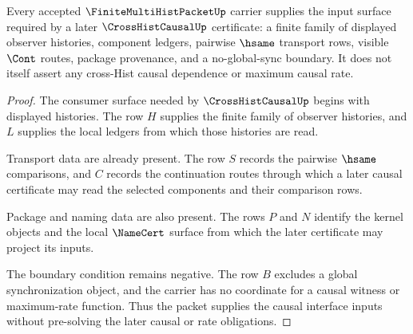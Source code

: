 \begin{theorem}
\label{thm:finite-multihist-packet-causal-interface}
Every accepted $\FiniteMultiHistPacketUp$ carrier supplies the input surface required by a later $\CrossHistCausalUp$ certificate: a finite family of displayed observer histories, component ledgers, pairwise $\hsame$ transport rows, visible $\Cont$ routes, package provenance, and a no-global-sync boundary. It does not itself assert any cross-Hist causal dependence or maximum causal rate.
\end{theorem}
\begin{proof}
The consumer surface needed by $\CrossHistCausalUp$ begins with displayed histories. The row $H$ supplies the finite family of observer histories, and $L$ supplies the local ledgers from which those histories are read.

Transport data are already present. The row $S$ records the pairwise $\hsame$ comparisons, and $C$ records the continuation routes through which a later causal certificate may read the selected components and their comparison rows.

Package and naming data are also present. The rows $P$ and $N$ identify the kernel objects and the local $\NameCert$ surface from which the later certificate may project its inputs.

The boundary condition remains negative. The row $B$ excludes a global synchronization object, and the carrier has no coordinate for a causal witness or maximum-rate function. Thus the packet supplies the causal interface inputs without pre-solving the later causal or rate obligations.
\end{proof}


